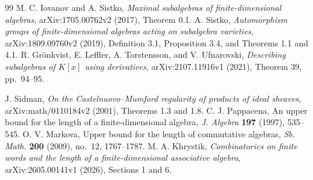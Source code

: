 \begin{thebibliography}{99}
 M. C. Iovanov and A. Sistko,
\emph{Maximal subalgebras of finite-dimensional algebras},
arXiv:1705.00762v2 (2017), Theorem 0.1.
 A. Sistko,
\emph{Automorphism groups of finite-dimensional algebras acting on
subalgebra varieties}, arXiv:1809.09760v2 (2019),
Definition 3.1, Proposition 3.4, and Theorems 1.1 and 4.1.
 R. Gr\"onkvist, E. Leffler, A. Torstensson, and V. Ufnarovski,
\emph{Describing subalgebras of $K[x]$ using derivatives},
arXiv:2107.11916v1 (2021), Theorem 39, pp.~94--95.

 J. Sidman,
\emph{On the Castelnuovo--Mumford regularity of products of ideal sheaves},
arXiv:math/0110184v2 (2001), Theorems 1.3 and 1.8.
 C. J. Pappacena,
An upper bound for the length of a finite-dimensional algebra,
\emph{J. Algebra} \textbf{197} (1997), 535--545.
 O. V. Markova,
Upper bound for the length of commutative algebras,
\emph{Sb. Math.} \textbf{200} (2009), no.~12, 1767--1787.
 M. A. Khrystik,
\emph{Combinatorics on finite words and the length of a finite-dimensional
associative algebra}, arXiv:2605.00141v1 (2026), Sections 1 and 6.
\end{thebibliography}

